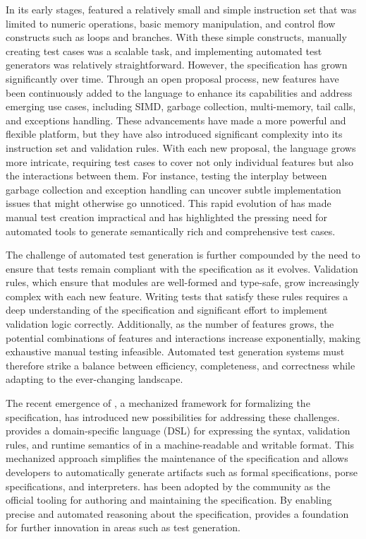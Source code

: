 In its early stages, \wasm featured a relatively small and simple instruction set
that was limited to numeric operations, basic memory manipulation,
and control flow constructs such as loops and branches.
With these simple constructs, manually creating test cases was a scalable task, and implementing
automated test generators was relatively straightforward.
However, the \wasm specification has grown significantly over time.
Through an open proposal process, new features have been continuously added to the language to enhance
its capabilities and address emerging use cases,
including SIMD, garbage collection, multi-memory, tail calls, and exceptions handling.
These advancements have made \wasm a more powerful and flexible platform, but they
have also introduced significant complexity into its instruction set and validation rules.
With each new proposal, the language grows more intricate,
requiring test cases to cover not only individual features but also the
interactions between them.
For instance, testing the interplay between garbage collection and exception handling
can uncover subtle implementation issues that might otherwise go unnoticed.
This rapid evolution of \wasm has made manual test
creation impractical and has highlighted the pressing need for automated tools
to generate semantically rich and comprehensive test cases.

The challenge of automated test generation is further compounded by the need to
ensure that tests remain compliant with the \wasm specification as it evolves.
Validation rules, which ensure that \wasm modules are well-formed and type-safe,
grow increasingly complex with each new feature.
Writing tests that satisfy these rules requires a deep understanding of the specification and significant
effort to implement validation logic correctly.
Additionally, as the number of features grows, the potential combinations of features and interactions
increase exponentially, making exhaustive manual testing infeasible.
Automated test generation systems must therefore strike a balance between efficiency,
completeness, and correctness while adapting to the ever-changing \wasm landscape.

The recent emergence of \spectec, a mechanized framework for formalizing the
\wasm specification, has introduced new possibilities for addressing these challenges.
\spectec provides a domain-specific language (DSL) for expressing
the syntax, validation rules, and runtime semantics of \wasm in a machine-readable and writable format.
This mechanized approach simplifies the maintenance of the specification and allows developers to automatically
generate artifacts such as formal specifications, porse specifications, and interpreters.
\spectec has been adopted by the \wasm community as the official tooling for authoring and maintaining the \wasm specification.
By enabling precise and automated reasoning about the specification, \spectec provides a
foundation for further innovation in areas such as test generation.


